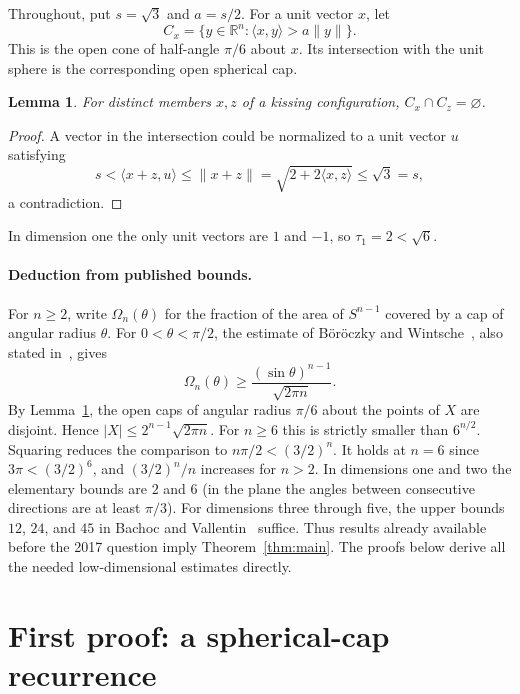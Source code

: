 \documentclass[11pt,a4paper]{article}
\newtheorem{lemma}[theorem]{Lemma}
\theoremstyle{remark}
\newcommand{\R}{\mathbb{R}}
\begin{document}
Throughout, put $s=\sqrt3$ and $a=s/2$. For a unit vector $x$, let
\[
 C_x=\{y\in\R^n:\langle x,y\rangle>a\|y\|\}.
\]
This is the open cone of half-angle $\pi/6$ about $x$. Its intersection with the unit sphere is the corresponding open spherical cap.

\begin{lemma}\label{lem:separation}
For distinct members $x,z$ of a kissing configuration, $C_x\cap C_z=\varnothing$.
\end{lemma}

\begin{proof}
A vector in the intersection could be normalized to a unit vector $u$ satisfying
\[
 s<\langle x+z,u\rangle\leq\|x+z\|
 =\sqrt{2+2\langle x,z\rangle}\leq\sqrt3=s,
\]
a contradiction.
\end{proof}

In dimension one the only unit vectors are $1$ and $-1$, so $\tau_1=2<\sqrt6$.

\paragraph{Deduction from published bounds.}
For $n\geq2$, write $\Omega_n(\theta)$ for the fraction of the area of $S^{n-1}$ covered by a cap of angular radius $\theta$. For $0<\theta<\pi/2$, the estimate of B\"or\"oczky and Wintsche~\cite[Corollary~3.2(i)]{BW}, also stated in~\cite[Lemma~3.4, (7)]{Naszodi}, gives
\[
 \Omega_n(\theta)\geq\frac{(\sin\theta)^{n-1}}{\sqrt{2\pi n}}.
\]
By Lemma~\ref{lem:separation}, the open caps of angular radius $\pi/6$ about the points of $X$ are disjoint. Hence $|X|\leq2^{n-1}\sqrt{2\pi n}$. For $n\geq6$ this is strictly smaller than $6^{n/2}$. Squaring reduces the comparison to $n\pi/2<(3/2)^n$. It holds at $n=6$ since $3\pi<(3/2)^6$, and $(3/2)^n/n$ increases for $n>2$. In dimensions one and two the elementary bounds are $2$ and $6$ (in the plane the angles between consecutive directions are at least $\pi/3$). For dimensions three through five, the upper bounds $12$, $24$, and $45$ in Bachoc and Vallentin~\cite[Table~5.1]{BV} suffice. Thus results already available before the 2017 question imply Theorem~\ref{thm:main}. The proofs below derive all the needed low-dimensional estimates directly.

\section{First proof: a spherical-cap recurrence}\label{sec:cap}
\end{document}

